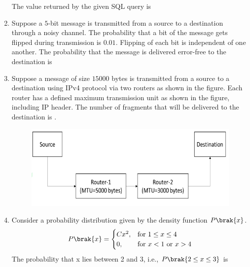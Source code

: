 \documentclass[a4paper, 11pt]{article}
\begin{document}
\begin{enumerate}
    The value returned by the given SQL query is \underline{\hspace{2cm}} 

    \hfill{}

    \item Suppose a $5$-bit message is transmitted from a source to a destination through a noisy channel. The probability that a bit of the message gets flipped during transmission is $0.01$. Flipping of each bit is independent of one another. The probability that the message is delivered error-free to the destination is \underline{\hspace{2cm}} 

    \hfill{}

    \item Suppose a message of size $15000$ bytes is transmitted from a source to a destination using IPv4 protocol via two routers as shown in the figure. Each router has a defined maximum transmission unit  as shown in the figure, including IP header. The number of fragments that will be delivered to the destination is \underline{\hspace{2cm}}. 
    \begin{figure}[H]
        \centering
        \includegraphics[width=0.7\columnwidth]{figs/q57.png}
    \end{figure}

    \hfill{}

    \item Consider a probability distribution given by the density function $P\brak{x}$.
    \[ P\brak{x} = \begin{cases} 
          Cx^2, & \text{for } 1 \le x \le 4 \\
          0, & \text{for } x < 1 \text{ or } x > 4
       \end{cases}
    \]
    The probability that x lies between 2 and 3, i.e., $P\brak{2 \le x \le 3}$ is \underline{\hspace{2cm}} 


\end{enumerate}
\end{document}
